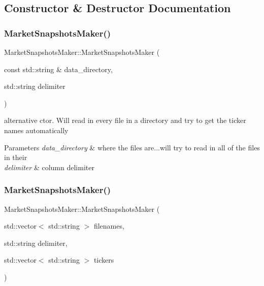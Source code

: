\subsection{Constructor \& Destructor Documentation}
\mbox{\label{classMarketSnapshotsMaker_a54050922d3dd9f554a5d3e4137e1963c}} 
\subsubsection{\texorpdfstring{Market\+Snapshots\+Maker()}{MarketSnapshotsMaker()}\hspace{0.1cm}{\footnotesize\ttfamily [1/2]}}
{\footnotesize\ttfamily Market\+Snapshots\+Maker\+::\+Market\+Snapshots\+Maker (\begin{DoxyParamCaption}\item[{const std\+::string \&}]{data\+\_\+directory,  }\item[{std\+::string}]{delimiter }\end{DoxyParamCaption})}



alternative ctor. Will read in every file in a directory and try to get the ticker names automatically 


\begin{DoxyParams}{Parameters}
{\em data\+\_\+directory} & where the files are...will try to read in all of the files in their \\
\hline
{\em delimiter} & column delimiter \\
\hline
\end{DoxyParams}
\mbox{\label{classMarketSnapshotsMaker_a8107a3b92c32118a667b5e86099ecde8}} 
\subsubsection{\texorpdfstring{Market\+Snapshots\+Maker()}{MarketSnapshotsMaker()}\hspace{0.1cm}{\footnotesize\ttfamily [2/2]}}
{\footnotesize\ttfamily Market\+Snapshots\+Maker\+::\+Market\+Snapshots\+Maker (\begin{DoxyParamCaption}\item[{std\+::vector$<$ std\+::string $>$}]{filenames,  }\item[{std\+::string}]{delimiter,  }\item[{std\+::vector$<$ std\+::string $>$}]{tickers }\end{DoxyParamCaption})}



